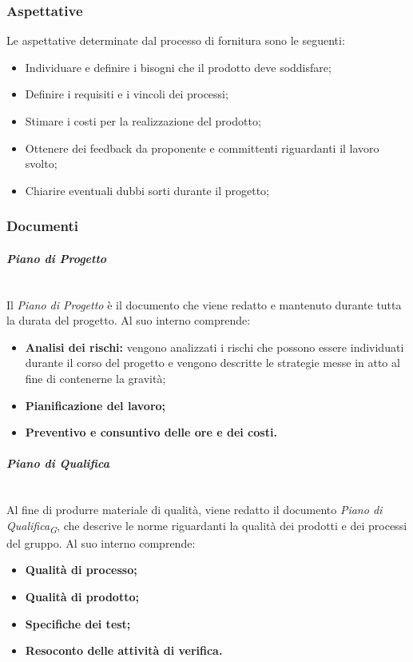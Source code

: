 \documentclass[a4paper, 12pt]{article}
\begin{document}
\subsubsection{Aspettative}
Le aspettative determinate dal processo di fornitura sono le seguenti:
\begin{itemize}
    \item Individuare e definire i bisogni che il prodotto deve soddisfare;
    \item Definire i requisiti e i vincoli dei processi;
    \item Stimare i costi per la realizzazione del prodotto;
    \item Ottenere dei feedback da proponente e committenti riguardanti il
    lavoro svolto;
    \item Chiarire eventuali dubbi sorti durante il progetto;
\end{itemize}

\subsubsection{Documenti}
\paragraph{\textit{Piano di Progetto}}
\\
Il \textit{Piano di Progetto} è il documento che viene redatto e mantenuto
durante tutta la durata del progetto. Al suo interno comprende:
\begin{itemize}
    \item \textbf{Analisi dei rischi:} vengono analizzati i rischi che possono
    essere individuati durante il corso del progetto e vengono descritte le
    strategie messe in atto al fine di contenerne la gravità;
    \item \textbf{Pianificazione del lavoro;}
    \item \textbf{Preventivo e consuntivo delle ore e dei costi.}
\end{itemize}
\paragraph{\textit{Piano di Qualifica}}
\\
Al fine di produrre materiale di qualità, viene redatto il documento
\textit{Piano di Qualifica}\textsubscript{\textit{G}}, che descrive le norme riguardanti la qualità dei prodotti e dei
processi del gruppo. Al suo interno comprende:
\begin{itemize}
    \item \textbf{Qualità di processo;}
    \item \textbf{Qualità di prodotto;}
    \item \textbf{Specifiche dei test;}
    \item \textbf{Resoconto delle attività di verifica.}
\end{itemize}
\end{document}
